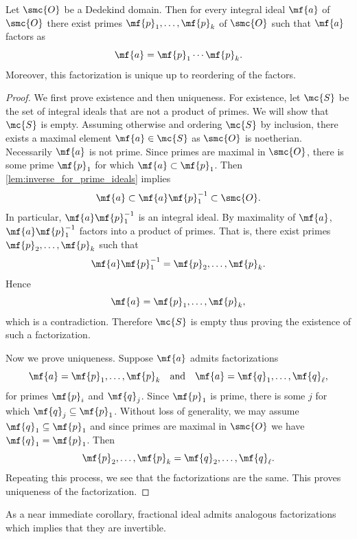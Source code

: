 \documentclass[12pt]{article}
\begin{document}
      \begin{theorem}\label{thm:unique_product_prime_ideals}
        Let \(\smc{O}\) be a Dedekind domain. Then for every integral ideal \(\mf{a}\) of \(\smc{O}\) there exist primes \(\mf{p}_{1},\ldots,\mf{p}_{k}\) of \(\smc{O}\) such that \(\mf{a}\) factors as
        \[
          \mf{a} = \mf{p}_{1} \cdots \mf{p}_{k}.
        \]
        Moreover, this factorization is unique up to reordering of the factors.
      \end{theorem}
      \begin{proof}
        We first prove existence and then uniqueness. For existence, let \(\mc{S}\) be the set of integral ideals that are not a product of primes. We will show that \(\mc{S}\) is empty. Assuming otherwise and ordering \(\mc{S}\) by inclusion, there exists a maximal element \(\mf{a} \in \mc{S}\) as \(\smc{O}\) is noetherian. Necessarily \(\mf{a}\) is not prime. Since primes are maximal in \(\smc{O}\), there is some prime \(\mf{p}_{1}\) for which \(\mf{a} \subset \mf{p}_{1}\). Then \cref{lem:inverse_for_prime_ideals} implies
        \[
          \mf{a} \subset \mf{a}\mf{p}_{1}^{-1} \subset \smc{O}.
        \]
        In particular, \(\mf{a}\mf{p}_{1}^{-1}\) is an integral ideal. By maximality of \(\mf{a}\), \(\mf{a}\mf{p}_{1}^{-1}\) factors into a product of primes. That is, there exist primes \(\mf{p}_{2},\ldots,\mf{p}_{k}\) such that
        \[
          \mf{a}\mf{p}_{1}^{-1} = \mf{p}_{2},\ldots,\mf{p}_{k}.
        \]
        Hence
        \[
          \mf{a} = \mf{p}_{1},\ldots,\mf{p}_{k},
        \]
        which is a contradiction. Therefore \(\mc{S}\) is empty thus proving the existence of such a factorization.
        
        Now we prove uniqueness. Suppose \(\mf{a}\) admits factorizations
        \[
          \mf{a} = \mf{p}_{1},\ldots,\mf{p}_{k} \quad \text{and} \quad \mf{a} = \mf{q}_{1},\ldots,\mf{q}_{\ell},
        \]
        for primes \(\mf{p}_{i}\) and \(\mf{q}_{j}\). Since \(\mf{p}_{1}\) is prime, there is some \(j\) for which \(\mf{q}_{j} \subseteq \mf{p}_{1}\). Without loss of generality, we may assume \(\mf{q}_{1} \subseteq \mf{p}_{1}\) and since primes are maximal in \(\smc{O}\) we have \(\mf{q}_{1} = \mf{p}_{1}\). Then
        \[
          \mf{p}_{2},\ldots,\mf{p}_{k} = \mf{q}_{2},\ldots,\mf{q}_{\ell}.
        \]
        Repeating this process, we see that the factorizations are the same. This proves uniqueness of the factorization.
      \end{proof}

      As a near immediate corollary, fractional ideal admits analogous factorizations which implies that they are invertible.
\end{document}
